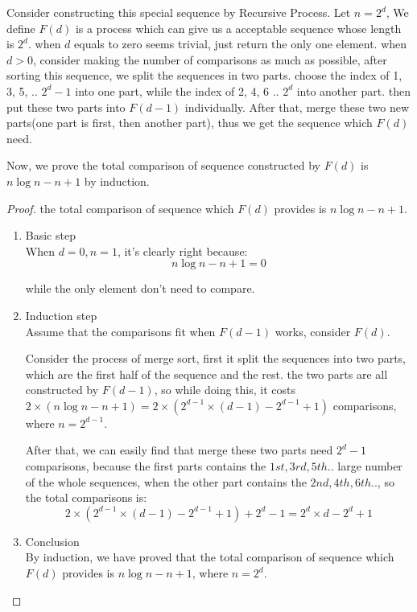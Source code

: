 Consider constructing this special sequence by Recursive Process. Let $n = 2^d$, We define $F(d)$ is a process which can give us a acceptable sequence whose length is $2^d$. when $d$ equals to zero seems trivial, just return the only one element. when $d > 0$, consider making the number of comparisons as much as possible, after sorting this sequence, we split the sequences in two parts. choose the index of 1, 3, 5, .. $2^d-1$ into one part, while the index of 2, 4, 6 .. $2^d$ into another part. then put these two parts into $F(d - 1)$ individually. After that, merge these two new parts(one part is first, then another part), thus we get the sequence which $F(d)$ need.

Now, we prove the total comparison of sequence constructed by $F(d)$ is $n\log n - n + 1$ by induction.

\begin{proof}
the total comparison of sequence which $F(d)$ provides is $n\log n - n + 1$.
\begin{enumerate}
    \item Basic step\\
    When $d = 0, n = 1$, it's clearly right because:
	\[n\log n - n + 1 = 0\]

    while the only element don't need to compare.
    \item Induction step\\
    Assume that the comparisons fit when $F(d - 1)$ works, consider $F(d)$.

    Consider the process of merge sort, first it split the sequences into two parts, which are the first half of the sequence and the rest. the two parts are all constructed by $F(d - 1)$, so while doing this, it costs $2 \times (n \log n - n + 1) = 2 \times (2 ^{d-1} \times (d - 1) - 2^{d - 1} + 1)$ comparisons, where $n = 2^{d - 1}$.

    After that, we can easily find that merge these two parts need $2^{d} - 1$ comparisons, because the first parts contains the $1st, 3rd, 5th ..$ large number of the whole sequences, when the other part contains the $2nd, 4th, 6th .. $, so the total comparisons is:
    \[2 \times (2^{d - 1} \times (d - 1) - 2^{d - 1} + 1) + 2^{d} - 1 = 2^{d} \times d - 2^{d} + 1\]

    \item Conclusion\\
	By induction, we have proved that the total comparison of sequence which $F(d)$ provides is $n\log n - n + 1$, where $n = 2^{d}$.
\end{enumerate}
\end{proof}
